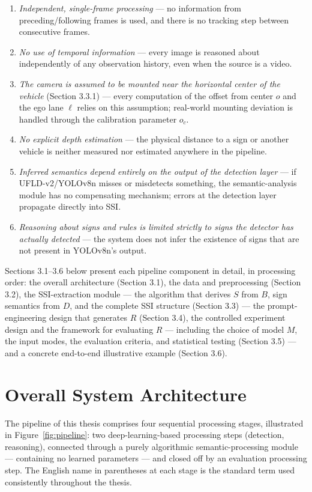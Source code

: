 \documentclass[12pt,a4paper]{report}
\begin{document}
\begin{enumerate}
    \item \textit{Independent, single-frame processing} --- no information from preceding/following frames is used, and there is no tracking step between consecutive frames.
    \item \textit{No use of temporal information} --- every image is reasoned about independently of any observation history, even when the source is a video.
    \item \textit{The camera is assumed to be mounted near the horizontal center of the vehicle} (Section 3.3.1) --- every computation of the offset from center $o$ and the ego lane $\ell$ relies on this assumption; real-world mounting deviation is handled through the calibration parameter $o_c$.
    \item \textit{No explicit depth estimation} --- the physical distance to a sign or another vehicle is neither measured nor estimated anywhere in the pipeline.
    \item \textit{Inferred semantics depend entirely on the output of the detection layer} --- if UFLD-v2/YOLOv8n misses or misdetects something, the semantic-analysis module has no compensating mechanism; errors at the detection layer propagate directly into SSI.
    \item \textit{Reasoning about signs and rules is limited strictly to signs the detector has actually detected} --- the system does not infer the existence of signs that are not present in YOLOv8n's output.
\end{enumerate}

Sections 3.1--3.6 below present each pipeline component in detail, in processing order: the overall architecture (Section 3.1), the data and preprocessing (Section 3.2), the SSI-extraction module --- the algorithm that derives $S$ from $B$, sign semantics from $D$, and the complete SSI structure (Section 3.3) --- the prompt-engineering design that generates $R$ (Section 3.4), the controlled experiment design and the framework for evaluating $R$ --- including the choice of model $M$, the input modes, the evaluation criteria, and statistical testing (Section 3.5) --- and a concrete end-to-end illustrative example (Section 3.6).

\section{Overall System Architecture}

The pipeline of this thesis comprises four sequential processing stages, illustrated in Figure~\ref{fig:pipeline}: two deep-learning-based processing steps (detection, reasoning), connected through a purely algorithmic semantic-processing module --- containing no learned parameters --- and closed off by an evaluation processing step. The English name in parentheses at each stage is the standard term used consistently throughout the thesis.
\end{document}
